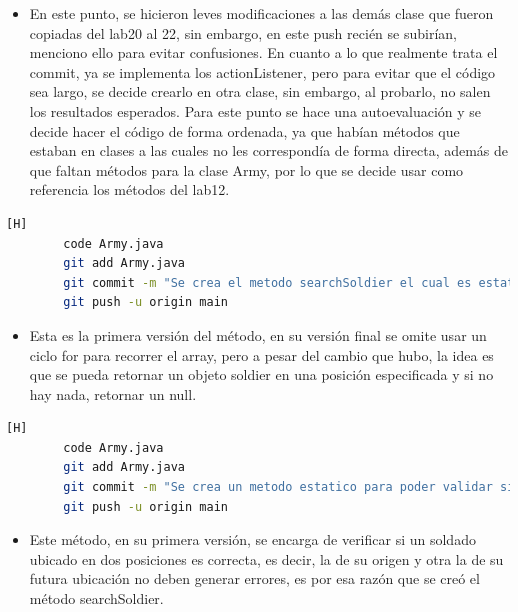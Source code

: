 \documentclass{article}
\begin{document}
	
	\begin{itemize}
	\item En este punto, se hicieron leves modificaciones  a las demás clase que fueron copiadas del lab20 al 22, sin embargo, en este push recién se subirían, menciono ello para evitar confusiones. En cuanto a lo que realmente trata el commit, ya se implementa los actionListener, pero para evitar que el código sea largo, se decide crearlo en otra clase, sin embargo, al probarlo, no salen los resultados esperados. Para este punto se hace una autoevaluación y se decide hacer el código de forma ordenada, ya que habían métodos que estaban en clases a las cuales no les correspondía de forma directa, además de que faltan métodos para la clase Army, por lo que se decide usar como referencia los métodos del lab12.
	\end{itemize}




	\begin{lstlisting}[language=bash,caption={Commit: 205507f3ac3fa3180df2e8ffeee4bcf425f8e622 }][H]
		code Army.java
		git add Army.java
		git commit -m "Se crea el metodo searchSoldier el cual es estatico"			
		git push -u origin main
	\end{lstlisting}
	
	\begin{itemize}
	\item Esta es la primera versión del método, en su versión final se omite usar un ciclo for para recorrer el array, pero a pesar del cambio que hubo, la idea es que se pueda retornar un objeto soldier en una posición especificada y si no hay nada, retornar un null.
	\end{itemize}


	
	\begin{lstlisting}[language=bash,caption={Commit: 3ee4852354ebaefb01e0ee7863610337747023cf }][H]
		code Army.java
		git add Army.java
		git commit -m "Se crea un metodo estatico para poder validar si la posicion de destino es la correcta"			
		git push -u origin main
	\end{lstlisting}
	
	
	\begin{itemize}
	\item Este método, en su primera versión, se encarga de verificar si un soldado ubicado en dos posiciones es correcta, es decir, la de su origen y otra la de su futura ubicación no deben generar errores, es por esa razón que se creó el método searchSoldier.
	\end{itemize}
\end{document}
